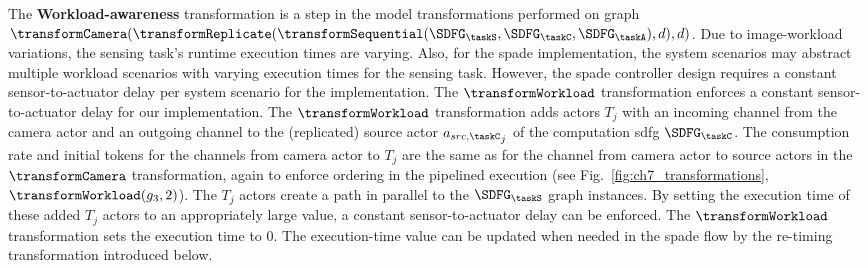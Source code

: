 The \textbf{Workload-awareness} transformation is a step in the model transformations performed on graph $\transformCamera(\transformReplicate(\transformSequential(\SDFG_{\taskS},\SDFG_{\taskC},\SDFG_{\taskA}),d),d)$.
Due to image-workload variations, the sensing task's runtime execution times are varying. 
Also, for the \gls{spade} implementation, the system scenarios may abstract multiple workload scenarios with varying execution times for the sensing task.
However, the \gls{spade} controller design requires a constant sensor-to-actuator delay per system scenario for the implementation.
The $\transformWorkload$ transformation enforces a constant sensor-to-actuator delay for our implementation.
The $\transformWorkload$ transformation adds actors $T_j$ with an incoming channel from the camera actor and an outgoing channel to the (replicated) source actor ${a_{src,{\taskC}}}_j$ of the computation \gls{sdfg} $\SDFG_{\taskC}$.
The consumption rate and initial tokens for the channels from camera actor to $T_j$ are the same as for the channel from camera actor to source actors in the $\transformCamera$ transformation, again to enforce ordering in the pipelined execution (see Fig.~\ref{fig:ch7_transformations}, $\transformWorkload(g_3,2)$).
The $T_j$ actors create a path in parallel to the $\SDFG_{\taskS}$ graph instances. By setting the execution time of these added $T_j$ actors to an appropriately large value, a constant sensor-to-actuator delay can be enforced. The $\transformWorkload$ transformation sets the execution time to 0. The execution-time value can be updated when needed in the \gls{spade} flow by the re-timing transformation introduced below.


